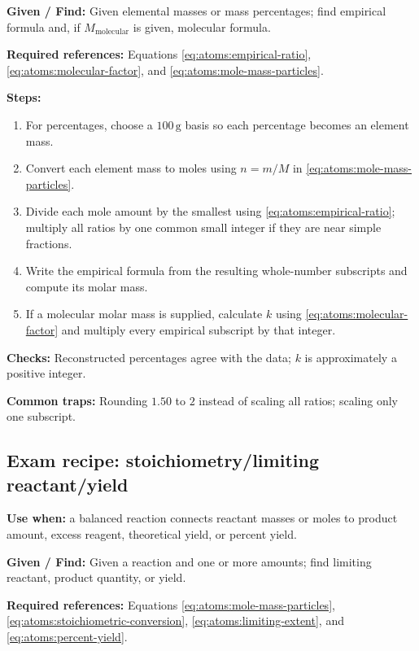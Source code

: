 \textbf{Given / Find:} Given elemental masses or mass percentages; find empirical formula and, if \(M_{\mathrm{molecular}}\) is given, molecular formula.

\textbf{Required references:} Equations \eqref{eq:atoms:empirical-ratio}, \eqref{eq:atoms:molecular-factor}, and \eqref{eq:atoms:mole-mass-particles}.


\textbf{Steps:}
\begin{enumerate}
    \item For percentages, choose a \(100\,\mathrm{g}\) basis so each percentage becomes an element mass.
    \item Convert each element mass to moles using \(n=m/M\) in \eqref{eq:atoms:mole-mass-particles}.
    \item Divide each mole amount by the smallest using \eqref{eq:atoms:empirical-ratio}; multiply all ratios by one common small integer if they are near simple fractions.
    \item Write the empirical formula from the resulting whole-number subscripts and compute its molar mass.
    \item If a molecular molar mass is supplied, calculate \(k\) using \eqref{eq:atoms:molecular-factor} and multiply every empirical subscript by that integer.
\end{enumerate}

\textbf{Checks:} Reconstructed percentages agree with the data; \(k\) is approximately a positive integer.

\textbf{Common traps:} Rounding \(1.50\) to \(2\) instead of scaling all ratios; scaling only one subscript.

\subsection{Exam recipe: stoichiometry/limiting reactant/yield}
\textbf{Use when:} a balanced reaction connects reactant masses or moles to product amount, excess reagent, theoretical yield, or percent yield.

\textbf{Given / Find:} Given a reaction and one or more amounts; find limiting reactant, product quantity, or yield.

\textbf{Required references:} Equations \eqref{eq:atoms:mole-mass-particles}, \eqref{eq:atoms:stoichiometric-conversion}, \eqref{eq:atoms:limiting-extent}, and \eqref{eq:atoms:percent-yield}.

